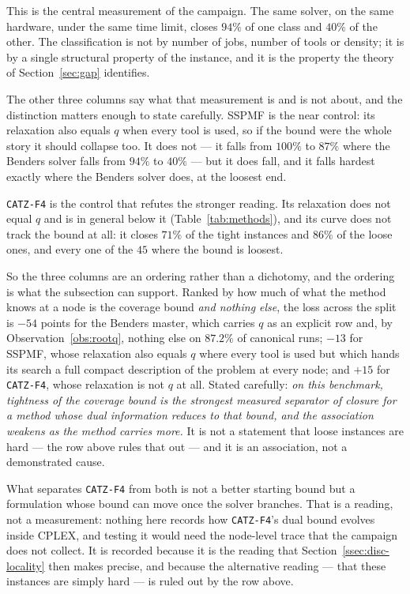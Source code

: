 This is the central measurement of the campaign. The same solver, on the same hardware,
under the same time limit, closes $94\%$ of one class and $40\%$ of the other. The
classification is not by number of jobs, number of tools or density; it is by a single
structural property of the instance, and it is the property the theory of
Section~\ref{sec:gap} identifies.

The other three columns say what that measurement is and is not about, and the
distinction matters enough to state carefully. SSPMF is the near control: its relaxation
also equals $q$ when every tool is used, so if the bound were the whole story it should
collapse too. It does not --- it falls from $100\%$ to $87\%$ where the Benders solver
falls from $94\%$ to $40\%$ --- but it does fall, and it falls hardest exactly where the
Benders solver does, at the loosest end.

\texttt{CATZ-F4} is the control that refutes the stronger reading. Its relaxation does
not equal $q$ and is in general below it (Table~\ref{tab:methods}), and its curve does
not track the bound at all: it closes $71\%$ of the tight instances and $86\%$ of the
loose ones, and every one of the $45$ where the bound is loosest.

So the three columns are an ordering rather than a dichotomy, and the ordering is what
the subsection can support. Ranked by how much of what the method knows at a node is
the coverage bound \emph{and nothing else}, the loss across the split is $-54$ points
for the Benders master, which carries $q$ as an explicit row and, by
Observation~\ref{obs:rootq}, nothing else on $87.2\%$ of canonical runs; $-13$ for SSPMF, whose
relaxation also equals $q$ where every tool is used but which hands its search a full
compact description of the problem at every node; and $+15$ for \texttt{CATZ-F4}, whose
relaxation is not $q$ at all. Stated carefully: \emph{on this benchmark, tightness of
the coverage bound is the strongest measured separator of closure for a method whose
dual information reduces to that bound, and the association weakens as the method
carries more.} It is not a statement that loose instances are hard --- the row above
rules that out --- and it is an association, not a demonstrated cause.

What separates \texttt{CATZ-F4} from both is not a better starting bound but a
formulation whose bound can move once the solver branches. That is a reading, not a
measurement: nothing here records how \texttt{CATZ-F4}'s dual bound evolves inside
CPLEX, and testing it would need the node-level trace that the campaign does not
collect. It is recorded because it is the reading that
Section~\ref{ssec:disc-locality} then makes precise, and because the alternative
reading --- that these instances are simply hard --- is ruled out by the row above.

